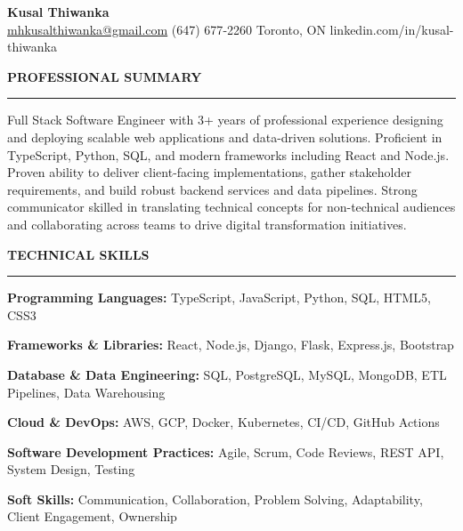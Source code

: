 \documentclass[10pt,letterpaper]{article}
\begin{document}
\begin{center}
{\LARGE\textbf{Kusal Thiwanka}}\\[3pt]
\href{mailto:mhkusalthiwanka@gmail.com}{mhkusalthiwanka@gmail.com}\hspace{2em}%
(647) 677{-}2260\hspace{2em}%
Toronto, ON\hspace{2em}
linkedin.com/in/kusal-thiwanka
\end{center}

\vspace{6pt}

\textbf{PROFESSIONAL SUMMARY}\\[-8pt]
\noindent\rule{\textwidth}{1pt}

\vspace{-2pt}

Full Stack Software Engineer with 3+ years of professional experience designing and deploying scalable web applications and data-driven solutions. Proficient in TypeScript, Python, SQL, and modern frameworks including React and Node.js. Proven ability to deliver client-facing implementations, gather stakeholder requirements, and build robust backend services and data pipelines. Strong communicator skilled in translating technical concepts for non-technical audiences and collaborating across teams to drive digital transformation initiatives.

\vspace{8pt}

\textbf{TECHNICAL SKILLS}\\[-8pt]
\noindent\rule{\textwidth}{1pt}

\vspace{-2pt}

\textbf{Programming Languages:} TypeScript, JavaScript, Python, SQL, HTML5, CSS3

\textbf{Frameworks \& Libraries:} React, Node.js, Django, Flask, Express.js, Bootstrap

\textbf{Database \& Data Engineering:} SQL, PostgreSQL, MySQL, MongoDB, ETL Pipelines, Data Warehousing

\textbf{Cloud \& DevOps:} AWS, GCP, Docker, Kubernetes, CI/CD, GitHub Actions

\textbf{Software Development Practices:} Agile, Scrum, Code Reviews, REST API, System Design, Testing

\textbf{Soft Skills:} Communication, Collaboration, Problem Solving, Adaptability, Client Engagement, Ownership

\vspace{8pt}
\end{document}
